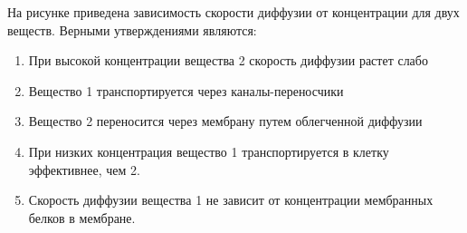 
На рисунке приведена зависимость скорости
диффузии от концентрации для двух веществ. Верными утверждениями являются:


\begin{enumerate}
    \item При высокой концентрации вещества 2 скорость диффузии растет слабо
    \item Вещество 1 транспортируется через каналы-переносчики
    \item Вещество 2 переносится через мембрану путем облегченной диффузии
    \item При низких концентрация вещество 1 транспортируется в клетку эффективнее, чем 2.
    \item Скорость диффузии вещества 1 не зависит от концентрации мембранных белков в мембране.
\end{enumerate}




